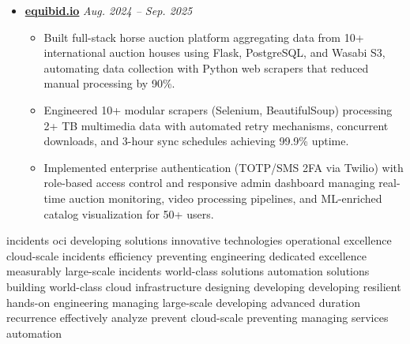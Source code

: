 \documentclass[A4,10pt]{article}
\begin{document}
\begin{itemize}[leftmargin=0in, label={}]
    \item \textbf{\href{https://github.com/b18050/visara}{ equibid.io}} \hfill \textit{Aug. 2024 -- Sep. 2025}
 \vspace{-1.5mm}
\begin{itemize}[leftmargin=0.25in]
    \item Built full-stack horse auction platform aggregating data from 10+ international auction houses using Flask, PostgreSQL, and Wasabi S3, 
    automating data collection with Python web scrapers that reduced manual processing by 90\%.
    \item Engineered 10+ modular scrapers (Selenium, BeautifulSoup) processing 2+ TB multimedia data with automated retry mechanisms, 
    concurrent downloads, and 3-hour sync schedules achieving 99.9\% uptime.
    \item Implemented enterprise authentication (TOTP/SMS 2FA via Twilio) with role-based access control and responsive admin dashboard managing
     real-time auction monitoring, video processing pipelines, and ML-enriched catalog visualization for 50+ users.
\end{itemize}



\end{itemize}


\par
{\color{white} incidents oci developing solutions innovative technologies operational excellence cloud-scale incidents efficiency preventing engineering dedicated excellence measurably large-scale incidents world-class solutions automation solutions building world-class cloud infrastructure designing developing developing resilient hands-on engineering managing large-scale developing advanced duration recurrence effectively analyze prevent cloud-scale preventing managing services automation}
\end{document}
